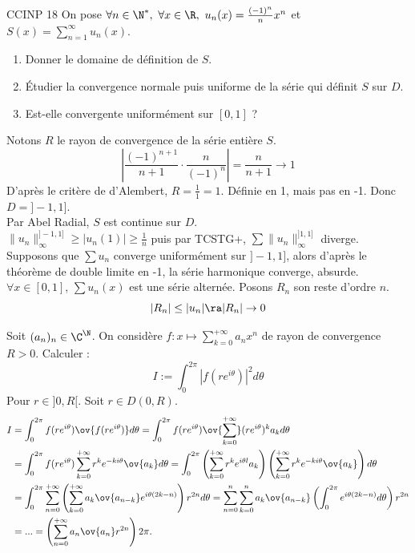 \documentclass[11pt]{article}
\begin{document}
\begin{exercice}{CCINP 18}{}
    On pose $\forall n \in \N^*, ~ \forall x \in \R, ~ u_n(x)=\frac{(-1)^n}{n}x^n$ et $S(x)=\sum_{n=1}^{\infty}u_n(x)$.
    \begin{enumerate}
        \item Donner le domaine de définition de $S$.
        \item Étudier la convergence normale puis uniforme de la série qui définit $S$ sur $D$.
        \item Est-elle convergente uniformément sur $[0,1]$ ?
    \end{enumerate}
    \tcblower
     Notons $R$ le rayon de convergence de la série entière $S$.
    \begin{equation*}
        \left|\frac{(-1)^{n+1}}{n+1}\cdot\frac{n}{(-1)^n}\right| = \frac{n}{n+1} \to 1
    \end{equation*}
    D'après le critère de d'Alembert, $R=\frac{1}{1}=1$. Définie en 1, mais pas en -1. Donc $D=]-1,1]$.\\
    Par Abel Radial, $S$ est continue sur $D$.\\
     $\|u_n\|_\infty^{]-1,1]}\geq|u_n(1)|\geq\frac{1}{n}$ puis par TCSTG+, $\sum\|u_n\|_\infty^{]1,1]}$ diverge.\\
    Supposons que $\sum u_n$ converge uniformément sur $]-1,1]$, alors d'après le théorème de double limite en -1, la série harmonique converge, absurde.\\
     $\forall x \in [0,1]$, $\sum u_n(x)$ est une série alternée. Posons $R_n$ son reste d'ordre $n$.
    \begin{equation*}
        |R_n|\leq|u_n| \ra |R_n|\to0
    \end{equation*}
\end{exercice}

\begin{exercice}{}{}
    Soit $(a_n)_n\in\C^\N$. On considère $f:x\mapsto\sum_{k=0}^{+\infty} a_nx^n$ de rayon de convergence $R>0$. Calculer :
    \begin{equation*}
        I:=\int_0^{2\pi}\left|f(re^{i\theta})\right|^2d\theta
    \end{equation*}
    Pour $r\in]0,R[$.
    \tcblower
    Soit $r\in D(0,R)$.
    \begin{align*}
        I &= \int_0^{2\pi}f(re^{i\theta})\ov{f(re^{i\theta})}d\theta = \int_0^{2\pi}f(re^{i\theta})\ov{\sum_{k=0}^{+\infty}}(re^{i\theta})^ka_kd\theta\\
        &= \int_0^{2\pi}f(re^{i\theta})\sum_{k=0}^{+\infty}r^ke^{-ki\theta}\ov{a_k}d\theta=\int_0^{2\pi}\left( \sum_{k=0}^{+\infty}r^ke^{i\theta l}a_k \right)\left( \sum_{k=0}^{+\infty}r^ke^{-ki\theta}\ov{a_k} \right)d\theta\\
        &= \int_0^{2\pi}\sum_{n=0}^{+\infty}\left( \sum_{k=0}^{+\infty} a_k\ov{a_{n-k}} e^{i\theta(2k-n)}\right)r^{2n}d\theta = \sum_{n=0}^n\sum_{k=0}^na_k\ov{a_{n-k}}\left( \int_0^{2\pi}e^{i\theta(2k-n)}d\theta \right)r^{2n}\\
        &= ... = \left( \sum_{n=0}^{+\infty}a_n\ov{a_n}r^{2n} \right)2\pi.
    \end{align*} 
\end{exercice}
\end{document}
